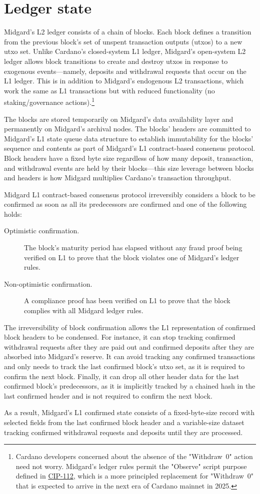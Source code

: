\documentclass[../midgard.tex]{subfiles}
\begin{document}
\chapter{Ledger state}
\label{h:ledger-state}

Midgard's L2 ledger consists of a chain of blocks.
Each block defines a transition from the previous block's set of unspent transaction outputs (utxos) to a new utxo set.
Unlike Cardano's closed-system L1 ledger, Midgard's open-system L2 ledger allows block transitions to create and destroy utxos in response to exogenous events---namely, deposits and withdrawal requests that occur on the L1 ledger.
This is in addition to Midgard's endogenous L2 transactions, which work the same as L1 transactions but with reduced functionality (no staking/governance actions).\footnote{Cardano developers concerned about the absence of the "Withdraw~0" action need not worry.
Midgard's ledger rules permit the "Observe" script purpose defined in \href{https://github.com/cardano-foundation/CIPs/tree/master/CIP-0112}{CIP-112}, which is a more principled replacement for "Withdraw~0" that is expected to arrive in the next era of Cardano mainnet in 2025.}

The blocks are stored temporarily on Midgard's data availability layer and permanently on Midgard's archival nodes.
The blocks' headers are committed to Midgard's L1 state queue data structure to establish immutability for the blocks' sequence and contents as part of Midgard's L1 contract-based consensus protocol.
Block headers have a fixed byte size regardless of how many deposit, transaction, and withdrawal events are held by their blocks---this size leverage between blocks and headers is how Midgard multiplies Cardano's transaction throughput.

Midgard L1 contract-based consensus protocol irreversibly considers a block to be confirmed as soon as all its predecessors are confirmed and one of the following holds:
\begin{description}
    \item[Optimistic confirmation.] The block's maturity period has elapsed without any fraud proof being verified on L1 to prove that the block violates one of Midgard's ledger rules.
    \item[Non-optimistic confirmation.] A compliance proof has been verified on L1 to prove that the block complies with all Midgard ledger rules.
\end{description}

The irreversibility of block confirmation allows the L1 representation of confirmed block headers to be condensed.
For instance, it can stop tracking confirmed withdrawal requests after they are paid out and confirmed deposits after they are absorbed into Midgard's reserve.
It can avoid tracking any confirmed transactions and only needs to track the last confirmed block's utxo set, as it is required to confirm the next block.
Finally, it can drop all other header data for the last confirmed block's predecessors, as it is implicitly tracked by a chained hash in the last confirmed header and is not required to confirm the next block.

As a result, Midgard's L1 confirmed state consists of a fixed-byte-size record with selected fields from the last confirmed block header and a variable-size dataset tracking confirmed withdrawal requests and deposits until they are processed.
\end{document}
